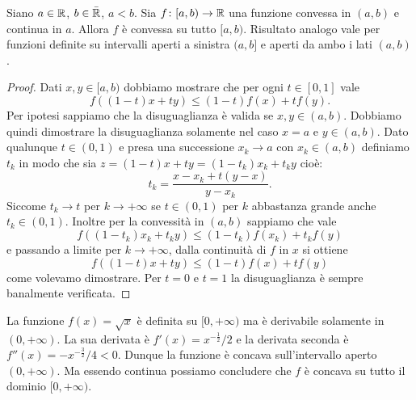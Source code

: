 \begin{theorem}
Siano $a\in {\mathbb R}$, $b\in \bar {{\mathbb R}}$, $a<b$.
Sia $f\colon [a,b)\to {\mathbb R}$ una funzione convessa in $(a,b)$ e continua in $a$. Allora $f$ è convessa su tutto $[a,b)$. Risultato analogo vale per funzioni definite su intervalli aperti a sinistra $(a,b]$
e aperti da ambo i lati $(a,b)$.
\end{theorem}
%
\begin{proof}
Dati $x,y \in [a,b)$ dobbiamo mostrare che per ogni $t\in[0,1]$ vale
\[
f((1-t) x+ t y) \le (1-t)f(x) + t f(y).
\]
Per ipotesi sappiamo che la disuguaglianza è valida se $x,y \in (a,b)$. Dobbiamo quindi dimostrare la disuguaglianza solamente nel caso $x=a$ e $y\in(a,b)$. Dato qualunque $t\in (0,1)$ e
presa una successione $x_k \to a$ con $x_k\in (a,b)$ definiamo
$t_k$ in modo che sia $z = (1-t)x + ty = (1-t_k) x_k + t_k y$
cioè:
\[
  t_k = \frac{x - x_k + t(y-x)}{y-x_k}.
\]
Siccome $t_k\to t$ per $k\to +\infty$ se $t\in (0,1)$ per $k$ abbastanza grande anche $t_k\in(0,1)$. Inoltre per la convessità in $(a,b)$ sappiamo che vale
\[
  f((1-t_k)x_k + t_k y) \le (1-t_k) f(x_k) + t_k f(y)
\]
e passando a limite per $k\to +\infty$, dalla continuità di $f$ in $x$ si ottiene
\[
   f((1-t)x+ty) \le (1-t) f(x) + t f(y)
\]
come volevamo dimostrare. Per $t=0$ e $t=1$ la disuguaglianza è sempre banalmente verificata.
\end{proof}

\begin{example}
La funzione $f(x) = \sqrt{x}$ è definita su $[0,+\infty)$ ma è derivabile solamente in $(0,+\infty)$. La sua derivata è $f'(x) = x^{-\frac 1 2 }/2$ e la derivata seconda è $f''(x) = -x^{-\frac 3 2}/4 < 0$. Dunque la funzione è concava sull'intervallo aperto $(0,+\infty)$. Ma essendo continua possiamo concludere che $f$ è concava su tutto il dominio $[0,+\infty)$.
\end{example}

